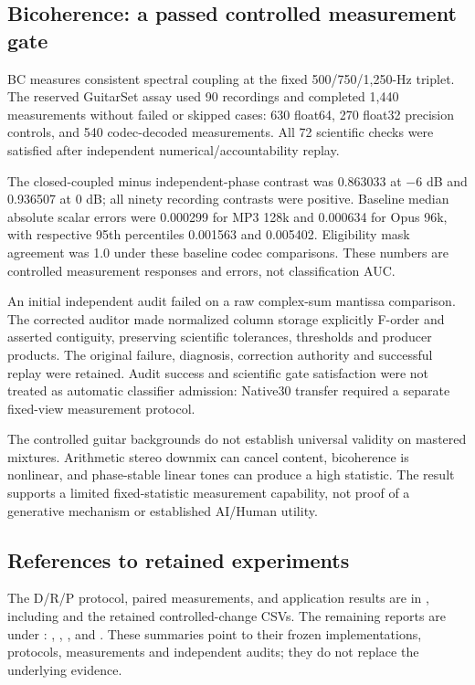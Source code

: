 \subsection{Bicoherence: a passed controlled measurement gate}

BC measures consistent spectral coupling at the fixed 500/750/1,250-Hz
triplet. The reserved GuitarSet assay used 90 recordings and completed 1,440
measurements without failed or skipped cases: 630 float64, 270 float32
precision controls, and 540 codec-decoded measurements. All 72 scientific
checks were satisfied after independent numerical/accountability replay.

The closed-coupled minus independent-phase contrast was 0.863033 at $-6$ dB
and 0.936507 at 0 dB; all ninety recording contrasts were positive. Baseline
median absolute scalar errors were 0.000299 for MP3 128k and 0.000634 for
Opus 96k, with respective 95th percentiles 0.001563 and 0.005402. Eligibility
mask agreement was 1.0 under these baseline codec comparisons. These numbers
are controlled measurement responses and errors, not classification AUC.

An initial independent audit failed on a raw complex-sum mantissa comparison.
The corrected auditor made normalized column storage explicitly F-order and
asserted contiguity, preserving scientific tolerances, thresholds and producer
products. The original failure, diagnosis, correction authority and successful
replay were retained. Audit success and scientific gate satisfaction were not
treated as automatic classifier admission: Native30 transfer required a
separate fixed-view measurement protocol.

The controlled guitar backgrounds do not establish universal validity on
mastered mixtures. Arithmetic stereo downmix can cancel content, bicoherence
is nonlinear, and phase-stable linear tones can produce a high statistic.
The result supports a limited fixed-statistic measurement capability, not
proof of a generative mechanism or established AI/Human utility.

\subsection{References to retained experiments}

\begingroup\raggedright
The D/R/P protocol, paired measurements, and application results are in
, including
 and the retained controlled-change CSVs.
The remaining reports are under
:
,
,
, and
.
These summaries point to their frozen implementations, protocols, measurements
and independent audits; they do not replace the underlying evidence.
\par\endgroup
